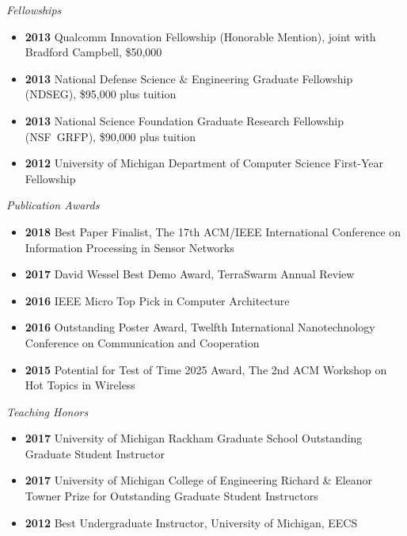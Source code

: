 \documentclass{article}
\begin{document}
\hspace{\parindent} \emph{Fellowships}

\begin{itemize}
  \item[] \textbf{2013} Qualcomm Innovation Fellowship (Honorable Mention), joint with Bradford Campbell, \$50,000
  \item[] \textbf{2013} National Defense Science \& Engineering Graduate Fellowship (NDSEG), \$95,000 plus tuition
  \item[] \textbf{2013} National Science Foundation Graduate Research Fellowship (NSF~GRFP), \$90,000 plus tuition
  \item[] \textbf{2012} University of Michigan Department of Computer Science First-Year Fellowship
\end{itemize}

\emph{Publication Awards}

\begin{itemize}
  \item[] \textbf{2018} Best Paper Finalist, The 17th ACM/IEEE International Conference on Information Processing in Sensor Networks
  \item[] \textbf{2017} David Wessel Best Demo Award, TerraSwarm Annual Review
  \item[] \textbf{2016} IEEE Micro Top Pick in Computer Architecture
  \item[] \textbf{2016} Outstanding Poster Award, Twelfth International Nanotechnology Conference on Communication and Cooperation
  \item[] \textbf{2015} Potential for Test of Time 2025 Award, The 2nd ACM Workshop on Hot Topics in Wireless
\end{itemize}

\emph{Teaching Honors}

\begin{itemize}
  \item[] \textbf{2017} University of Michigan Rackham Graduate School Outstanding Graduate Student Instructor
  \item[] \textbf{2017} University of Michigan College of Engineering Richard \& Eleanor Towner Prize for Outstanding Graduate Student Instructors
  \item[] \textbf{2012} Best Undergraduate Instructor, University of Michigan, EECS
\end{itemize}
\end{document}
